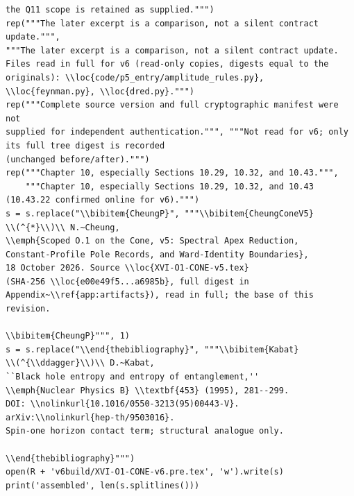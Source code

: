 \documentclass[10pt]{article}
\begin{document}
\begin{lstlisting}
the Q11 scope is retained as supplied.""")
rep("""The later excerpt is a comparison, not a silent contract update.""",
"""The later excerpt is a comparison, not a silent contract update.
Files read in full for v6 (read-only copies, digests equal to the
originals): \\loc{code/p5_entry/amplitude_rules.py},
\\loc{feynman.py}, \\loc{dred.py}.""")
rep("""Complete source version and full cryptographic manifest were not
supplied for independent authentication.""", """Not read for v6; only its full tree digest is recorded
(unchanged before/after).""")
rep("""Chapter 10, especially Sections 10.29, 10.32, and 10.43.""",
    """Chapter 10, especially Sections 10.29, 10.32, and 10.43
(10.43.22 confirmed online for v6).""")
s = s.replace("\\bibitem{CheungP}", """\\bibitem{CheungConeV5}
\\(^{*}\\)\\ N.~Cheung,
\\emph{Scoped O.1 on the Cone, v5: Spectral Apex Reduction,
Constant-Profile Pole Records, and Ward-Identity Boundaries},
18 October 2026. Source \\loc{XVI-O1-CONE-v5.tex}
(SHA-256 \\loc{e00e49f5...a6985b}, full digest in
Appendix~\\ref{app:artifacts}), read in full; the base of this revision.

\\bibitem{CheungP}""", 1)
s = s.replace("\\end{thebibliography}", """\\bibitem{Kabat}
\\(^{\\ddagger}\\)\\ D.~Kabat,
``Black hole entropy and entropy of entanglement,''
\\emph{Nuclear Physics B} \\textbf{453} (1995), 281--299.
DOI: \\nolinkurl{10.1016/0550-3213(95)00443-V}.
arXiv:\\nolinkurl{hep-th/9503016}.
Spin-one horizon contact term; structural analogue only.

\\end{thebibliography}""")
open(R + 'v6build/XVI-O1-CONE-v6.pre.tex', 'w').write(s)
print('assembled', len(s.splitlines()))
\end{lstlisting}
\end{document}

